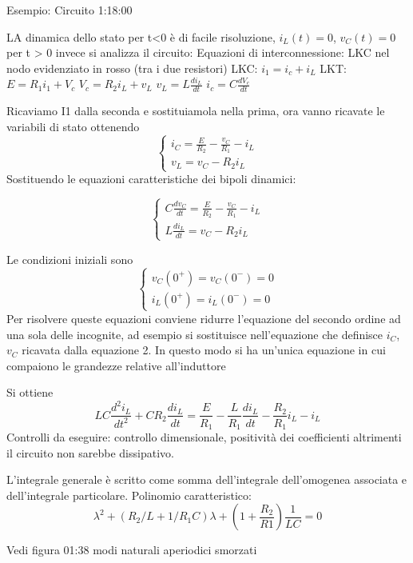 Esempio: Circuito 1:18:00

LA dinamica dello stato per t<0 è di facile risoluzione, $i_L(t) = 0$, $v_C(t) = 0$
per t >  0 invece si analizza il circuito:
Equazioni di interconnessione: LKC nel nodo evidenziato in rosso (tra i due resistori)
LKC: $i_1 = i_c+i_L$
LKT: $E = R_1 i_1 + V_c$
$V_c = R_2 i_L + v_L$
$v_L = L\frac{di_L}{dt}$
$i_c = C\frac{dV_c}{dt}$

Ricaviamo I1 dalla seconda e sostituiamola nella prima,
ora vanno ricavate le variabili di stato ottenendo
$$
\begin{cases}
i_C = \frac{E}{R_2} - \frac{v_C}{R_1} - i_L \\
v_L = v_C - R_2 i_L
\end{cases}
$$
Sostituendo le equazioni caratteristiche dei bipoli dinamici:

$$
\begin{cases}
C\frac{dv_C}{dt} = \frac{E}{R_2} - \frac{v_C}{R_1} - i_L \\
L\frac{di_L}{dt} = v_C - R_2 i_L
\end{cases}
$$

Le condizioni iniziali sono 
$$\begin{cases}
v_C(0^+) = v_C(0^-) = 0\\
i_L(0^+) = i_L(0^-) = 0
\end{cases}
$$
Per risolvere queste equazioni conviene ridurre l'equazione del secondo ordine ad una sola delle incognite,
ad esempio si sostituisce nell'equazione che definisce $i_C$, $v_C$ ricavata dalla equazione 2.
In questo modo si ha un'unica equazione in cui compaiono le grandezze relative all'induttore

Si ottiene 
\begin{equation}
LC \frac{d^2i_L}{dt^2} + CR_2\frac{di_L}{dt} = \frac{E}{R_1} - \frac{L}{R_1}\frac{di_L}{dt} - \frac{R_2}{R_1}i_L-i_L
\end{equation}
Controlli da eseguire: controllo dimensionale, positività dei coefficienti altrimenti il circuito non sarebbe dissipativo.

L'integrale generale è scritto come somma dell'integrale dell'omogenea associata e dell'integrale particolare.
Polinomio caratteristico:
\begin{equation}
 \lambda^2 + (R_2/L + 1/R_1 C)\lambda + (1+\frac{R_2}{R1})\frac{1}{LC} = 0
\end{equation}

Vedi figura 01:38 modi naturali aperiodici smorzati

